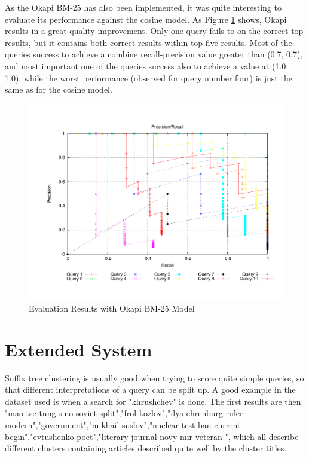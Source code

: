 As the Okapi BM-25 has also been implemented, it was quite interesting to evaluate its performance against the cosine model. As Figure \ref{fig:okapi} shows, Okapi results in a great quality improvement. Only one query fails to on the correct top results, but it contains both correct results within top five results. Most of the queries success to achieve a combine recall-precision value greater than (0.7, 0.7), and most important one of the queries success also to achieve a value at (1.0, 1.0), while the worst performance (observed for query number four) is just the same as for the cosine model.

\begin{figure}
\includegraphics[width=1.0\textwidth]{include/bench_okapi}
\caption{Evaluation Results with Okapi BM-25 Model}
\label{fig:okapi}
\end{figure}

\section{Extended System}

Suffix tree clustering is usually good when trying to score quite simple queries, so that different interpretations of a query can be split up. A good example in the dataset used is when a search for "khrushchev" is done. The first results are then "mao tse tung sino soviet split","frol kozlov","ilya ehrenburg ruler modern","government","mikhail suslov","nuclear test ban current begin","evtushenko poet","literary journal novy mir veteran ", which all describe different clusters  containing articles described quite well by the cluster titles.

